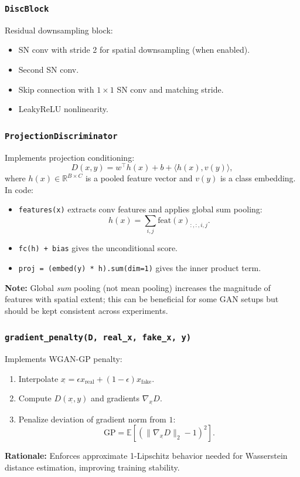\subsubsection*{\texttt{DiscBlock}}
Residual downsampling block:
\begin{itemize}
  \item SN conv with stride 2 for spatial downsampling (when enabled).
  \item Second SN conv.
  \item Skip connection with \(1\times 1\) SN conv and matching stride.
  \item LeakyReLU nonlinearity.
\end{itemize}

\subsubsection*{\texttt{ProjectionDiscriminator}}
Implements projection conditioning:
\[
D(x,y) = w^\top h(x) + b + \langle h(x), v(y)\rangle,
\]
where \(h(x)\in\mathbb{R}^{B\times C}\) is a pooled feature vector and \(v(y)\) is a class embedding. In code:
\begin{itemize}
  \item \texttt{features(x)} extracts conv features and applies global sum pooling:
  \[
  h(x) = \sum_{i,j} \text{feat}(x)_{:,:,i,j}.
  \]
  \item \texttt{fc(h) + bias} gives the unconditional score.
  \item \texttt{proj = (embed(y) * h).sum(dim=1)} gives the inner product term.
\end{itemize}
\textbf{Note:} Global \emph{sum} pooling (not mean pooling) increases the magnitude of features with spatial extent; this can be beneficial for some GAN setups but should be kept consistent across experiments.

\subsubsection*{\texttt{gradient\_penalty(D, real\_x, fake\_x, y)}}
Implements WGAN-GP penalty:
\begin{enumerate}
  \item Interpolate \(x_{\hat{}}=\epsilon x_{\text{real}}+(1-\epsilon)x_{\text{fake}}\).
  \item Compute \(D(x_{\hat{}},y)\) and gradients \(\nabla_{x_{\hat{}}}D\).
  \item Penalize deviation of gradient norm from \(1\):
  \[
  \mathrm{GP}=\mathbb{E}\left[(\|\nabla_{x_{\hat{}}}D\|_2-1)^2\right].
  \]
\end{enumerate}
\textbf{Rationale:} Enforces approximate 1-Lipschitz behavior needed for Wasserstein distance estimation, improving training stability.

